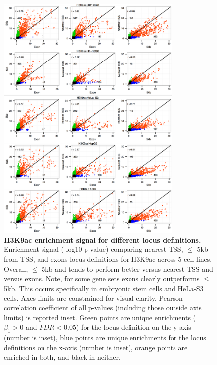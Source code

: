 \newpage

\begin{figure}[ht!]
\centering
\includegraphics[width=0.8\textwidth]{chap2figs/figure2_8.pdf}
\caption[H3K9ac enrichment signal for different locus definitions.]
{
\textbf{H3K9ac enrichment signal for different locus definitions.} Enrichment signal (-log10 p-value) comparing nearest TSS, $\leq$ 5kb from TSS, and exons locus definitions for H3K9ac across 5 cell lines. Overall, $\leq$ 5kb and tends to perform better versus nearest TSS and versus exons. Note, for some gene sets exons clearly outperforms $\leq$ 5kb. This occurs specifically in embryonic stem cells and HeLa-S3 cells. Axes limits are constrained for visual clarity. Pearson correlation coefficient of all p-values (including those outside axis limits) is reported inset. Green points are unique enrichments ($\beta_1 > 0$ and $FDR < 0.05$) for the locus definition on the y-axis (number is inset), blue points are unique enrichments for the locus definitions on the x-axis (number is inset), orange points are enriched in both, and black in neither.
}
\label{chap2:fig:8}
\end{figure}

